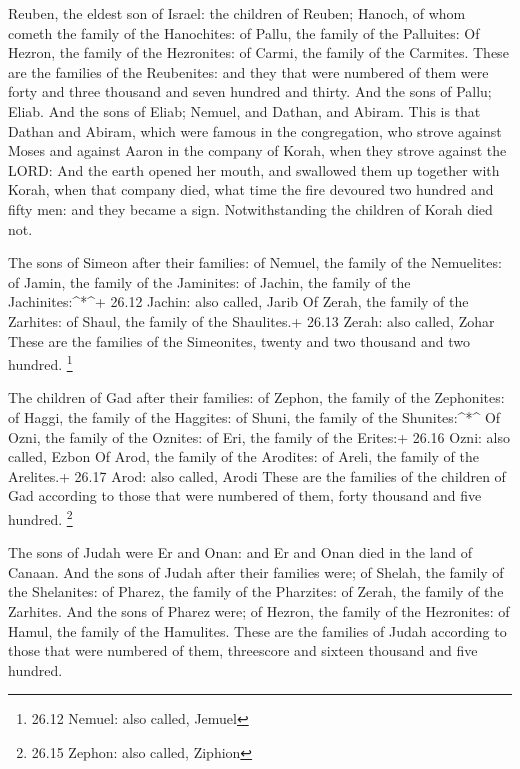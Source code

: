  Reuben, the eldest son of Israel: the children of Reuben;
Hanoch, of whom cometh the family of the Hanochites: of Pallu, the
family of the Palluites:  Of Hezron, the family of the
Hezronites: of Carmi, the family of the Carmites.  These are
the families of the Reubenites: and they that were numbered of them were
forty and three thousand and seven hundred and thirty.  And
the sons of Pallu; Eliab.  And the sons of Eliab; Nemuel,
and Dathan, and Abiram. This is that Dathan and Abiram, which were
famous in the congregation, who strove against Moses and against Aaron
in the company of Korah, when they strove against the LORD:
 And the earth opened her mouth, and swallowed them up
together with Korah, when that company died, what time the fire devoured
two hundred and fifty men: and they became a sign. 
Notwithstanding the children of Korah died not.

 The sons of Simeon after their families: of Nemuel, the
family of the Nemuelites: of Jamin, the family of the Jaminites: of
Jachin, the family of the Jachinites:\^{}*\^{}+ 26.12 Jachin: also
called, Jarib  Of Zerah, the family of the Zarhites: of
Shaul, the family of the Shaulites.+ 26.13 Zerah: also called, Zohar
 These are the families of the Simeonites, twenty and two
thousand and two hundred. \footnote{26.12 Nemuel: also called, Jemuel}

 The children of Gad after their families: of Zephon, the
family of the Zephonites: of Haggi, the family of the Haggites: of
Shuni, the family of the Shunites:\^{}*\^{}  Of Ozni, the
family of the Oznites: of Eri, the family of the Erites:+ 26.16 Ozni:
also called, Ezbon  Of Arod, the family of the Arodites: of
Areli, the family of the Arelites.+ 26.17 Arod: also called, Arodi
 These are the families of the children of Gad according to
those that were numbered of them, forty thousand and five hundred.
\footnote{26.15 Zephon: also called, Ziphion}

 The sons of Judah were Er and Onan: and Er and Onan died
in the land of Canaan.  And the sons of Judah after their
families were; of Shelah, the family of the Shelanites: of Pharez, the
family of the Pharzites: of Zerah, the family of the Zarhites.
 And the sons of Pharez were; of Hezron, the family of the
Hezronites: of Hamul, the family of the Hamulites.  These
are the families of Judah according to those that were numbered of them,
threescore and sixteen thousand and five hundred.

